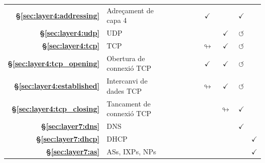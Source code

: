{\begin{tabular}{rl ccccccccc}
    \textbf{\S\ref{sec:layer4:addressing}}  & Adreçament de capa 4                               &                   &                    &                    &                    &                    & $\checkmark$         &                         & $\checkmark$         &                      \\
    \rowcolor{color1!15!white}
    \textbf{\S\ref{sec:layer4:udp}}  & UDP                                              &                   &                    &                    &                    &                    &                      & $\checkmark$            & $\circlearrowleft$   &                      \\
    \textbf{\S\ref{sec:layer4:tcp}}  & TCP                                              &                   &                    &                    &                    &                    & $\looparrowright$    & $\checkmark$            & $\circlearrowleft$   &                      \\
    \rowcolor{color1!15!white}
    \textbf{\S\ref{sec:layer4:tcp_opening}}  & Obertura de connexió TCP                           &                   &                    &                    &                    &                    & $\checkmark$         & $\checkmark$            & $\circlearrowleft$   &                      \\
    \textbf{\S\ref{sec:layer4:established}}  & Intercanvi de dades TCP                                &                   &                    &                    &                    &                    & $\looparrowright$    & $\checkmark$            & $\circlearrowleft$   &                      \\
    \rowcolor{color1!15!white}
    \textbf{\S\ref{sec:layer4:tcp_closing}}  & Tancament de connexió TCP                           &                   &                    &                    &                    &                    &                      & $\looparrowright$       & $\checkmark$         &                      \\
    \textbf{\S\ref{sec:layer7:dns}} & DNS                                              &                   &                    &                    &                    &                    &                      &                         & $\checkmark$         &                      \\
    \rowcolor{color1!15!white}
    \textbf{\S\ref{sec:layer7:dhcp}} & DHCP                                             &                   &                    &                    &                    &                    &                      &                         &                      & $\checkmark$         \\
    \textbf{\S\ref{sec:layer7:as}} & ASs, IXPs, NPs                                   &                   &                    &                    &                    &                    &                      &                         &                      & $\checkmark$         \\
\end{tabular}
}
